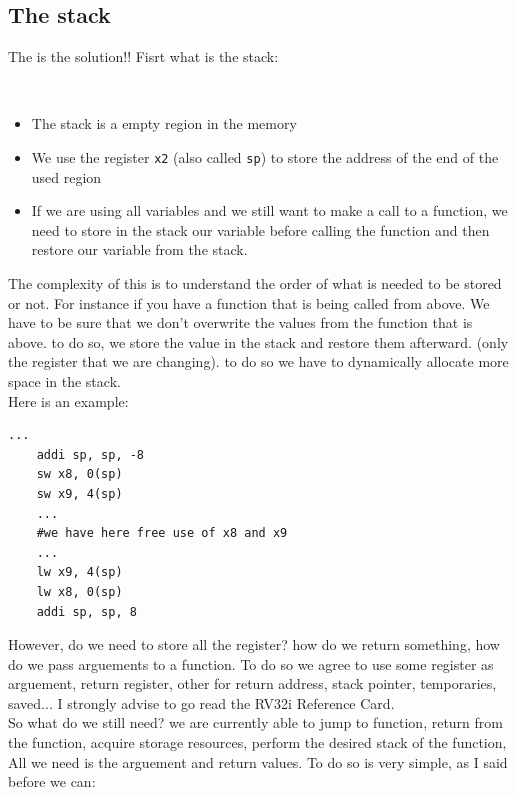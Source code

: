 \subsection{The stack}
The  is the solution!! Fisrt what is the stack:\\
\begin{definition}
$ $\\
\begin{itemize}
    \item The stack is a empty region in the memory 
    \item We use the register \texttt{x2} (also called \texttt{sp}) to store the address of the end of the used region
    \item If we are using all variables and we still want to make a call to a function, we need to store in the stack our variable before calling the function and then restore our variable from the stack.
\end{itemize}
\end{definition}
The complexity of this is to understand the order of what is needed to be stored or not. For instance if you have a function that is being called from above. We have to be sure that we don't overwrite the values from the function that is above. to do so, we store the value in the stack and restore them afterward. (only the register that we are changing). to do so we have to dynamically allocate more space in the stack.\\ 
Here is an example:
\begin{lstlisting}[language={[RISC-V]Assembler}]
	...
	addi sp, sp, -8 
	sw x8, 0(sp)
	sw x9, 4(sp)
	...
	#we have here free use of x8 and x9
	...
	lw x9, 4(sp)
	lw x8, 0(sp)
	addi sp, sp, 8
\end{lstlisting}
However, do we need to store all the register? how do we return something, how do we pass arguements to a function. To do so we agree to use some register as arguement, return register, other for return address, stack pointer, temporaries, saved... I strongly advise to go read the RV32i Reference Card.\\
So what do we still need? we are currently able to jump to function, return from the function, acquire storage resources, perform the desired stack of the function, All we need is the arguement and return values.
To do so is very simple, as I said before we can:
